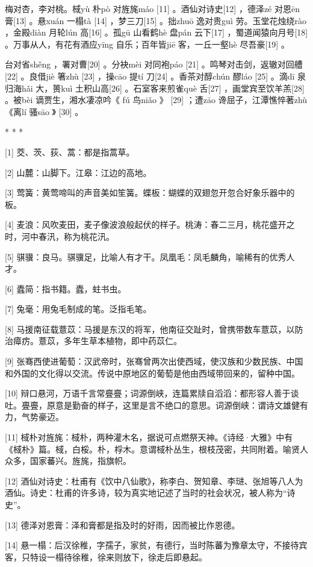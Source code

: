 \documentclass[12pt,UTF8]{ctexbook}
\begin{document}
梅对杏，李对桃。棫yù 朴pò 对旌旄máo [11] 。酒仙对诗史[12] ，德泽zé 对恩ēn 膏[13] 。悬xuán 一榻tà [14] ，梦三刀[15] 。拙zhuō 逸对贵guì 劳。玉堂花烛绕rào ，金殿diàn 月轮lún 高[16] 。孤gū 山看鹤hè 盘pán 云下[17] ，蜀道闻猿向月号[18] 。万事从人，有花有酒应yīng 自乐；百年皆jiē 客，一丘一壑hè 尽吾豪[19] 。

台对省shěng ，署对曹[20] 。分袂mèi 对同袍páo [21] 。鸣琴对击剑，返辙对回艚[22] 。良借jiè 箸zhù [23] ，操cāo 提tí 刀[24] 。香茶对醇chún 醪láo [25] 。滴dī 泉归海hǎi 大，篑kuì 土积山高[26] 。石室客来煎雀què 舌[27] ，画堂宾至饮羊羔[28] 。被bèi 谪贾生，湘水凄凉吟《 fú 鸟niǎo 》 [29] ；遭zāo 谗屈子，江潭憔悴著zhù 《离lí 骚sāo 》 [30] 。



* * *



[1] 茭、茨、荻、蒿：都是指蒿草。

[2] 山麓：山脚下。江皋：江边的高地。

[3] 莺簧：黄莺啼叫的声音美如笙簧。蝶板：蝴蝶的双翅忽开忽合好象乐器中的板。

[4] 麦浪：风吹麦田，麦子像波浪般起伏的样子。桃涛：春二三月，桃花盛开之时，河中春汛，称为桃花汛。

[5] 骐骥：良马。骐骥足，比喻人有才干。凤凰毛：凤毛麟角，喻稀有的优秀人才。

[6] 蠹简：指书籍。蠹，蛀书虫。

[7] 兔毫：用兔毛制成的笔。泛指毛笔。

[8] 马援南征载薏苡：马援是东汉的将军，他南征交趾时，曾携带数车薏苡，以防治瘴疠。薏苡，多年生草本植物，即中药苡仁。

[9] 张骞西使进葡萄：汉武帝时，张骞曾两次出使西域，使汉族和少数民族、中国和外国的文化得以交流。传说中原地区的葡萄是他由西域带回来的，留种中国。

[10] 辩口悬河，万语千言常亹亹；词源倒峡，连篇累牍自滔滔：都形容人善于谈吐。亹亹，原意是勤奋的样子，这里是言不绝口的意思。词源倒峡：谓诗文雄健有力，气势豪迈。

[11] 棫朴对旌旄：棫朴，两种灌木名，据说可点燃祭天神。《诗经·大雅》中有《棫朴》篇。棫，白桵。朴，桴木。意谓棫朴丛生，根枝茂密，共同附着。喻贤人众多，国家蕃兴。旌旄，指旗帜。

[12] 酒仙对诗史：杜甫有《饮中八仙歌》，称李白、贺知章、李琎、张旭等八人为酒仙。诗史：杜甫的许多诗，较为真实地记述了当时的社会状况，被人称为“诗史”。

[13] 德泽对恩膏：泽和膏都是指及时的好雨，因而被比作恩德。

[14] 悬一榻：后汉徐稚，字孺子，家贫，有德行，当时陈蕃为豫章太守，不接待宾客，只特设一榻待徐稚，徐来则放下，徐走后即悬起。
\end{document}
